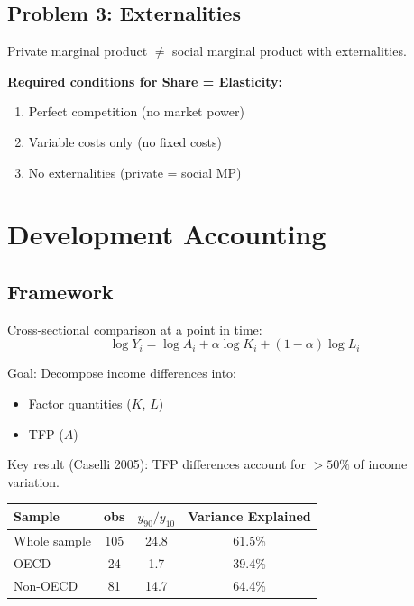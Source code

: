 \documentclass[a4paper,11pt]{article}
\begin{document}
\subsection*{Problem 3: Externalities}

Private marginal product $\neq$ social marginal product with externalities.

\begin{resultbox}
\textbf{Required conditions for Share = Elasticity:}
\begin{enumerate}
    \item Perfect competition (no market power)
    \item Variable costs only (no fixed costs)
    \item No externalities (private = social MP)
\end{enumerate}
\end{resultbox}

\section{Development Accounting}

\subsection*{Framework}

Cross-sectional comparison at a point in time:
\[
\log Y_i = \log A_i + \alpha \log K_i + (1-\alpha)\log L_i
\tag{Dev-Accounting}
\]

Goal: Decompose income differences into:
\begin{itemize}
    \item Factor quantities ($K$, $L$)
    \item TFP ($A$)
\end{itemize}

Key result (Caselli 2005): TFP differences account for $>50\%$ of income variation.

\begin{center}
\begin{tabular}{lccc}
\toprule
Sample & obs & $y_{90}/y_{10}$ & Variance Explained \\
\midrule
Whole sample & 105 & 24.8 & 61.5\% \\
OECD & 24 & 1.7 & 39.4\% \\
Non-OECD & 81 & 14.7 & 64.4\% \\
\bottomrule
\end{tabular}
\end{center}
\end{document}
